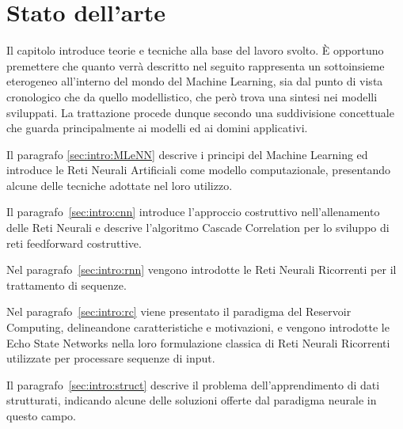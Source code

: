 \chapter{Stato dell'arte}\label{ch:background}
Il capitolo introduce teorie e tecniche alla base del lavoro svolto. \`E opportuno premettere che quanto verrà descritto nel seguito rappresenta un sottoinsieme eterogeneo all'interno del mondo del Machine Learning, sia dal punto di vista cronologico che da quello modellistico, che però trova una sintesi nei modelli sviluppati. La trattazione procede dunque secondo una suddivisione concettuale che guarda principalmente ai modelli ed ai domini applicativi.

Il paragrafo \ref{sec:intro:MLeNN} descrive i principi del Machine Learning ed introduce le Reti Neurali Artificiali come modello computazionale, presentando alcune delle tecniche adottate nel loro utilizzo.

Il paragrafo~\ref{sec:intro:cnn} introduce l'approccio costruttivo nell'allenamento delle Reti Neurali e descrive l'algoritmo Cascade Correlation per lo sviluppo di reti feedforward costruttive.

Nel paragrafo~\ref{sec:intro:rnn} vengono introdotte le Reti Neurali Ricorrenti per il trattamento di sequenze.

Nel paragrafo~\ref{sec:intro:rc} viene presentato il paradigma del Reservoir Computing, delineandone caratteristiche e motivazioni, e vengono introdotte le Echo State Networks nella loro formulazione classica di Reti Neurali Ricorrenti utilizzate per processare sequenze di input.

Il paragrafo~\ref{sec:intro:struct} descrive il problema dell'apprendimento di dati strutturati, indicando alcune delle soluzioni offerte dal paradigma neurale in questo campo.


